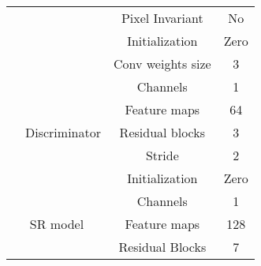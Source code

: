 \begin{table}[H]
{\begin{tabular}{|ccc|cc|}
    \multicolumn{1}{|c|}{}                                    & \multicolumn{1}{c|}{}                             &                         & Pixel Invariant              & No                 \\
    \multicolumn{1}{|c|}{}                                    & \multicolumn{1}{c|}{}                             &                         & Initialization               & Zero               \\
    \multicolumn{1}{|c|}{}                                    & \multicolumn{1}{c|}{}                             &                         & Conv weights size            & 3                  \\ \cline{2-5} 
    \multicolumn{1}{|c|}{}                                    & \multicolumn{2}{c|}{\multirow{5}{*}{Discriminator}}                         & Channels                     & 1                  \\
    \multicolumn{1}{|c|}{}                                    & \multicolumn{2}{c|}{}                                                       & Feature maps                 & 64                 \\
    \multicolumn{1}{|c|}{}                                    & \multicolumn{2}{c|}{}                                                       & Residual blocks              & 3                  \\
    \multicolumn{1}{|c|}{}                                    & \multicolumn{2}{c|}{}                                                       & Stride                       & 2                  \\
    \multicolumn{1}{|c|}{}                                    & \multicolumn{2}{c|}{}                                                       & Initialization               & Zero               \\ \hline
    \multicolumn{3}{|c|}{\multirow{4}{*}{SR model}}                                                                                         & Channels                     & 1                  \\
    \multicolumn{3}{|c|}{}                                                                                                                  & Feature maps                 & 128                \\
    \multicolumn{3}{|c|}{}                                                                                                                  & Residual Blocks              & 7                  \\

\end{tabular}}
\end{table}
